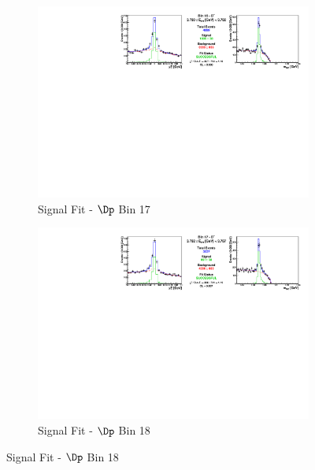 \begin{figure}[h]

\begin{subfigure}[c]{0.99\textwidth}
\includegraphics[width=\textwidth]{figures/plots/fit_results/Dp_bin_16.pdf}
\caption*{Signal Fit - $\Dp$ Bin 17}
\end{subfigure}

\vspace{5pt}

\begin{subfigure}[c]{0.99\textwidth}
\includegraphics[width=\textwidth]{figures/plots/fit_results/Dp_bin_17.pdf}
\caption*{Signal Fit - $\Dp$ Bin 18}
\end{subfigure}

\vspace{5pt}


\end{figure}
